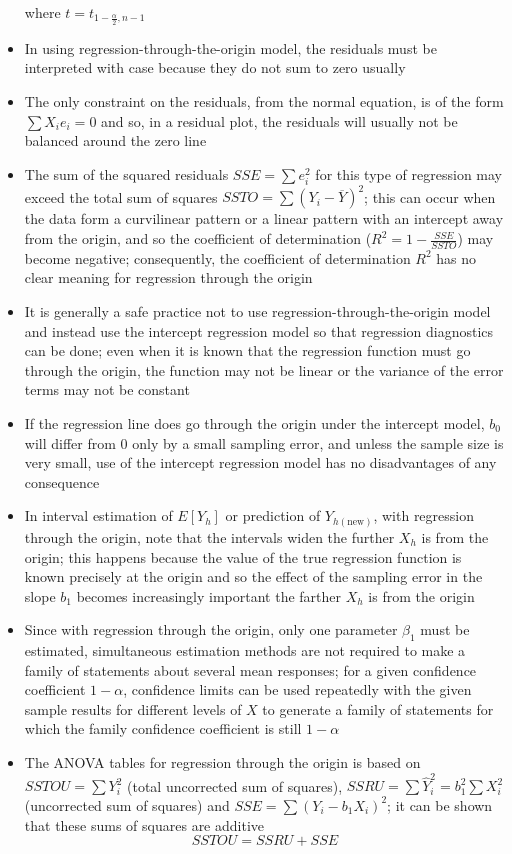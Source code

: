 \begin{itemize}
where $t = t_{1 - \frac{\alpha}{2}, n-1}$ 
\item In using regression-through-the-origin model, the residuals must be interpreted with case because they do not sum to zero usually
\item The only constraint on the residuals, from the normal equation, is of the form $\sum X_ie_i = 0$ and so, in a residual plot, the residuals will usually not be balanced around the zero line
\item The sum of the squared residuals $SSE = \sum e_i^2$ for this type of regression may exceed the total sum of squares $SSTO = \sum (Y_i - \overline{Y})^2$; this can occur when the data form a curvilinear pattern or a linear pattern with an intercept away from the origin, and so the coefficient of determination ($R^2 = 1 - \frac{SSE}{SSTO}$) may become negative; consequently, the coefficient of determination $R^2$ has no clear meaning for regression through the origin
\item It is generally a safe practice not to use regression-through-the-origin model and instead use the intercept regression model so that regression diagnostics can be done; even when it is known that the regression function must go through the origin, the function may not be linear or the variance of the error terms may not be constant
\item If the regression line does go through the origin under the intercept model, $b_0$ will differ from $0$ only by a small sampling error, and unless the sample size is very small, use of the intercept regression model has no disadvantages of any consequence
\item In interval estimation of $E[Y_h]$ or prediction of $Y_{h(\text{new})}$, with regression through the origin, note that the intervals widen the further $X_h$ is from the origin; this happens because the value of the true regression function is known precisely at the origin and so the effect of the sampling error in the slope $b_1$ becomes increasingly important the farther $X_h$ is from the origin
\item Since with regression through the origin, only one parameter $\beta_1$ must be estimated, simultaneous estimation methods are not required to make a family of statements about several mean responses; for a given confidence coefficient $1-\alpha$, confidence limits can be used repeatedly with the given sample results for different levels of $X$ to generate a family of statements for which the family confidence coefficient is still $1-\alpha$
\item The ANOVA tables for regression through the origin is based on $SSTOU = \sum Y_i^2$ (total uncorrected sum of squares), $SSRU = \sum \hat{Y}_i^2 = b_1^2 \sum X_i^2 $ (uncorrected sum of squares) and $SSE = \sum (Y_i - b_1X_i)^2$; it can be shown that these sums of squares are additive $$ SSTOU = SSRU + SSE $$ 
\end{itemize}

